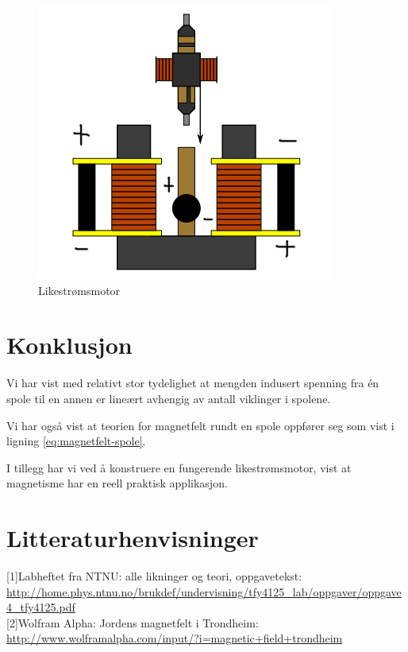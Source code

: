 \documentclass[12pt,norsk,a4paper]{article}
\begin{document}
\begin{figure}[H]

\includegraphics{motor.png}
\caption{Likestrømsmotor}
\label{fig:motor}
\end{figure}
\clearpage

\section{Konklusjon}
Vi har vist med relativt stor tydelighet at mengden indusert spenning fra én spole til en annen er lineært avhengig av antall viklinger i spolene.

Vi har også vist at teorien for magnetfelt rundt en spole oppfører seg som vist i ligning \ref{eq:magnetfelt-spole}. 

I tillegg har vi ved å konstruere en fungerende likestrømsmotor, vist at magnetisme har en reell praktisk applikasjon.
\clearpage

\section{Litteraturhenvisninger}
{[1]}Labheftet fra NTNU: alle likninger og teori, oppgavetekst:  \url{http://home.phys.ntnu.no/brukdef/undervisning/tfy4125_lab/oppgaver/oppgave4_tfy4125.pdf} \\
{[2]}Wolfram Alpha: Jordens magnetfelt i Trondheim: \url{http://www.wolframalpha.com/input/?i=magnetic+field+trondheim}
\end{document}
